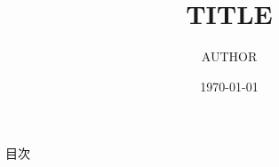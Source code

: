 \documentclass[dvipdfmx,11pt,uplatex, notheorems]{beamer}
\title{TITLE}
\author{AUTHOR}
\date{\today}
\begin{document}
\frame{\maketitle}

\begin{frame}{目次}
  \tableofcontents
\end{frame}



\end{document}
